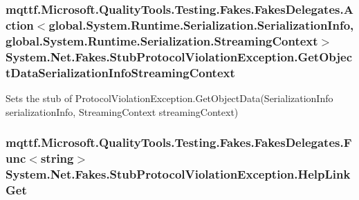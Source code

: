 \hypertarget{class_system_1_1_net_1_1_fakes_1_1_stub_protocol_violation_exception_aaf4a0bdfd39058972a43eb35521abe94}{
\subsubsection[{Get\-Object\-Data\-Serialization\-Info\-Streaming\-Context}]{\setlength{\rightskip}{0pt plus 5cm}mqttf.\-Microsoft.\-Quality\-Tools.\-Testing.\-Fakes.\-Fakes\-Delegates.\-Action$<$global.\-System.\-Runtime.\-Serialization.\-Serialization\-Info, global.\-System.\-Runtime.\-Serialization.\-Streaming\-Context$>$ System.\-Net.\-Fakes.\-Stub\-Protocol\-Violation\-Exception.\-Get\-Object\-Data\-Serialization\-Info\-Streaming\-Context}}\label{class_system_1_1_net_1_1_fakes_1_1_stub_protocol_violation_exception_aaf4a0bdfd39058972a43eb35521abe94}


Sets the stub of Protocol\-Violation\-Exception.\-Get\-Object\-Data(\-Serialization\-Info serialization\-Info, Streaming\-Context streaming\-Context)

\hypertarget{class_system_1_1_net_1_1_fakes_1_1_stub_protocol_violation_exception_a0b78da680e11b2d4b18ed505707a6607}{
\subsubsection[{Help\-Link\-Get}]{\setlength{\rightskip}{0pt plus 5cm}mqttf.\-Microsoft.\-Quality\-Tools.\-Testing.\-Fakes.\-Fakes\-Delegates.\-Func$<$string$>$ System.\-Net.\-Fakes.\-Stub\-Protocol\-Violation\-Exception.\-Help\-Link\-Get}}\label{class_system_1_1_net_1_1_fakes_1_1_stub_protocol_violation_exception_a0b78da680e11b2d4b18ed505707a6607}


